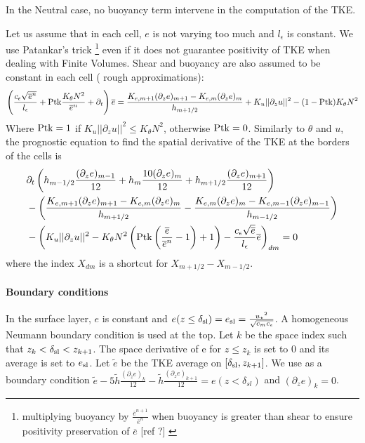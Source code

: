 In the Neutral case, no buoyancy term intervene in the computation
of the TKE.

Let us assume that in each cell, $e$ is not varying too much and
$l_\epsilon$ is constant. We use Patankar's trick
\footnote{
	multiplying buoyancy by $\frac{\overline{e}^{n+1}}{\overline{e}^n}$ when buoyancy is greater than shear
to ensure positivity preservation of $\overline{e}$ {\color{red}[ref ?]
}} even if it does not guarantee positivity of TKE when
dealing with Finite Volumes.
Shear and buoyancy are also assumed to be constant in each cell
({\color{red} rough approximations}):
\begin{equation}
\label{eq:ND_StratifiedCase_SemiDiscreteTKE}
    \left(
    \frac{c_\epsilon \sqrt{\overline{e}^n}}{l_\epsilon}
	+ {\rm Ptk} \frac{K_{\theta} N^2}{\overline{e}^n}
    + \partial_t
    \right) \overline{e}
    =\frac{K_{e,m+1} (\partial_z e)_{m+1} -
    K_{e,m} (\partial_z e)_{m}}{h_{m+1/2}}
    + K_u ||\partial_z u||^2
    - (1 - {\rm Ptk}) K_\theta N^2
\end{equation}
Where ${\rm Ptk}=1$ if $K_u ||\partial_z u||^2 \leq K_\theta N^2$, 
otherwise ${\rm Ptk}=0$.
Similarly to $\theta$ and $u$, the prognostic equation
to find the spatial derivative of the TKE at 
the borders of the cells is
\begin{equation}
\label{eq:ND_StratifiedCase_prognosticTKE_FV}
\begin{aligned}
&\partial_t
\left(
    h_{m-1/2}\frac{(\partial_z e)_{m-1}}{12}+
    h_m\frac{10(\partial_z e)_{m}}{12}+
    h_{m+1/2}\frac{(\partial_z e)_{m+1}}{12}
\right)
\\&-
    \left(\frac{K_{e,m+1} (\partial_z e)_{m+1} -
        K_{e,m} (\partial_z e)_{m}}{h_{m+1/2}}
-
    \frac{K_{e,m} (\partial_z e)_{m} -
        K_{e,m-1} (\partial_z e)_{m-1}}{h_{m-1/2}}
        \right)
\\
&- \left(K_{u} ||\partial_z u||^2
-  K_\theta N^2 
\left({\rm Ptk}
\left(\frac{\overline{e}}{\overline{e}^n} - 1\right)
+ 1\right)
- \frac{c_\epsilon \sqrt{\overline{e}}}{l_\epsilon} \overline{e}
\right)_{dm} = 0
\end{aligned}
\end{equation}
where the index $X_{dm}$ is a shortcut for $X_{m+1/2} - X_{m-1/2}$.

\paragraph{Boundary conditions}
In the surface layer, $e$ is constant
and $e(z\leq \delta_{\rm sl}) = e_{\rm sl} = \frac{{u_\star}^2}{\sqrt{c_m c_\epsilon}}$.
A homogeneous Neumann boundary condition is used at the top.
Let $k$ be the space index such that
$z_k < \delta_{\rm sl} < z_{k+1}$. The space derivative of e for
$z \leq z_k$ is set to 0 and its average is set to $e_{\rm sl}$.
Let $\widetilde{e}$ be the TKE average on
$[\delta_{\rm sl}, z_{k+1}]$.
We use as a boundary condition $\widetilde{e} - 5 \widetilde{h}
\frac{ (\partial_z e)_k}{12} -
\widetilde{h}\frac{ (\partial_z e)_{k+1}}{12}= e(z<\delta_{sl})$
and $(\partial_z e)_k = 0$.

